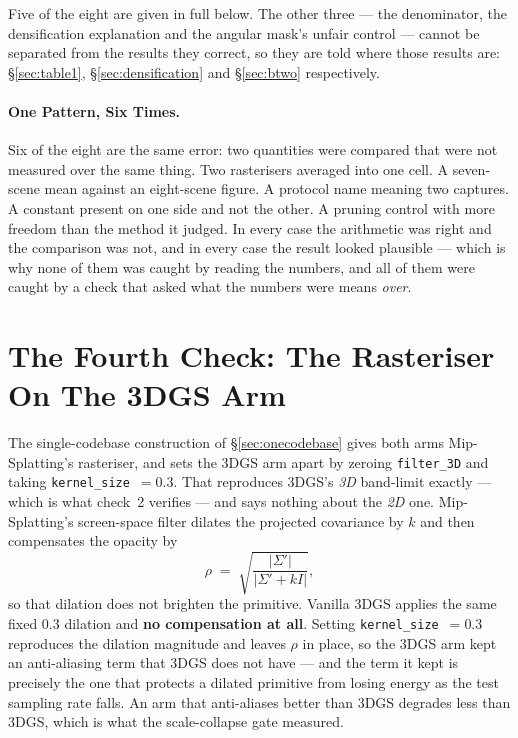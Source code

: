 \medskip
Five of the eight are given in full below. The other three --- the denominator,
the densification explanation and the angular mask's unfair control --- cannot be separated
from the results they correct, so they are told where those results are:
\S\ref{sec:table1}, \S\ref{sec:densification} and \S\ref{sec:btwo}
respectively.

\paragraph{One Pattern, Six Times.} Six of the eight are the same error: two
quantities were compared that were not measured over the same thing. Two
rasterisers averaged into one cell. A seven-scene mean against an eight-scene
figure. A protocol name meaning two captures. A constant present on one side and
not the other. A pruning control with more freedom than the method it judged. In
every case the arithmetic was right and the comparison was not, and in every case
the result looked plausible --- which is why none of them was caught by reading
the numbers, and all of them were caught by a check that asked what the numbers
were means \emph{over}.

\section{The Fourth Check: The Rasteriser On The 3DGS Arm}

The single-codebase construction of \S\ref{sec:onecodebase} gives both arms
Mip-Splatting's rasteriser, and sets the 3DGS arm apart by zeroing \texttt{filter\_3D}
and taking \texttt{kernel\_size}~$=0.3$. That reproduces 3DGS's \emph{3D}
band-limit exactly --- which is what check~2 verifies --- and says nothing about
the \emph{2D} one. Mip-Splatting's screen-space filter dilates the projected
covariance by $k$ and then compensates the opacity by
\begin{equation}
  \rho \;=\; \sqrt{\frac{\lvert\Sigma'\rvert}{\lvert\Sigma' + kI\rvert}} ,
\end{equation}
so that dilation does not brighten the primitive. Vanilla 3DGS applies the same
fixed $0.3$ dilation and \textbf{no compensation at all}. Setting
\texttt{kernel\_size}~$=0.3$ reproduces the dilation magnitude and leaves $\rho$
in place, so the 3DGS arm kept an anti-aliasing term that 3DGS does not have --- and
the term it kept is precisely the one that protects a dilated primitive from
losing energy as the test sampling rate falls. An arm that anti-aliases better
than 3DGS degrades less than 3DGS, which is what the scale-collapse gate measured.

